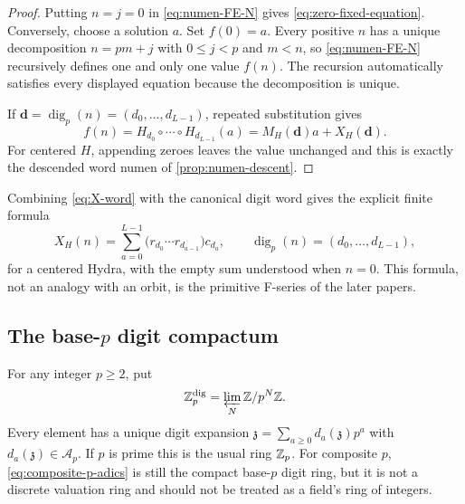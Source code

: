 \begin{proof}
Putting $n=j=0$ in \cref{eq:numen-FE-N} gives
\cref{eq:zero-fixed-equation}.  Conversely, choose a solution $a$.  Set
$f(0)=a$.  Every positive $n$ has a unique decomposition $n=pm+j$ with
$0\leq j<p$ and $m<n$, so \cref{eq:numen-FE-N} recursively defines one and
only one value $f(n)$.  The recursion automatically satisfies every
displayed equation because the decomposition is unique.

If $\mathbf d=\operatorname{dig}_p(n)=(d_0,\ldots,d_{L-1})$, repeated
substitution gives
\begin{equation}
\label{eq:finite-general-solution}
 f(n)=H_{d_0}\circ\cdots\circ H_{d_{L-1}}(a)
     =M_H(\mathbf d)a+X_H(\mathbf d).
\end{equation}
For centered $H$, appending zeroes leaves the value unchanged and this is
exactly the descended word numen of \cref{prop:numen-descent}.
\end{proof}

Combining \cref{eq:X-word} with the canonical digit word gives the explicit
finite formula
\begin{equation}
\label{eq:numen-finite-digit-formula}
 X_H(n)=\sum_{a=0}^{L-1}
 \bigl(r_{d_0}\cdots r_{d_{a-1}}\bigr)c_{d_a},
 \qquad \operatorname{dig}_p(n)=(d_0,\ldots,d_{L-1}),
\end{equation}
for a centered Hydra, with the empty sum understood when $n=0$.  This
formula, not an analogy with an orbit, is the primitive F-series of the later
papers.

\subsection{The base-\texorpdfstring{$p$}{p} digit compactum}

For any integer $p\geq2$, put
\begin{equation}
\label{eq:composite-p-adics}
 \mathbb Z_p^{\mathrm{dig}}=\varprojlim_N\mathbb Z/p^N\mathbb Z.
\end{equation}
Every element has a unique digit expansion
$\mathfrak z=\sum_{a\geq0}d_a(\mathfrak z)p^a$ with
$d_a(\mathfrak z)\in\mathcal A_p$.  If $p$ is prime this is the usual ring
$\mathbb Z_p$.  For composite $p$, \cref{eq:composite-p-adics} is still the compact
base-$p$ digit ring, but it is not a discrete valuation ring and should not
be treated as a field's ring of integers.

